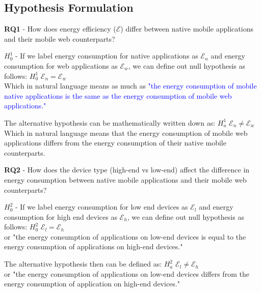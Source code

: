 \subsection{Hypothesis Formulation}
\textbf{RQ1} - How does energy efficiency ($\mathcal{E}$)  differ between native mobile applications and their mobile web counterparts?

$H_0^1$ - If we label energy consumption for native applications as $\mathcal{E}_n$ and  energy consumption for web applications as $\mathcal{E}_w$, we can define out null hypothesis as follows:
\newline $H_0^1$        $\mathcal{E}_n = \mathcal{E}_w$\\
Which in natural language means as much as \textcolor{blue}{ "the energy consumption of mobile native applications is the same as the energy consumption of mobile web applications."}

The alternative hypothesis can be mathematically written down as:
\newline $H_a^1$      $\mathcal{E}_n \neq \mathcal{E}_w$\\ 
Which in natural language means that the energy consumption of mobile web applications differs from the energy consumption of their native mobile counterparts.
 
\textbf{RQ2} - How does the device type (high-end vs low-end) affect the difference in energy consumption between native mobile applications and their mobile  web counterparts?

$H_0^2$ - If we label energy consumption for low end devices as $\mathcal{E}_l$ and  energy consumption for high end devices as $\mathcal{E}_h$, we can define out null hypothesis as follows:
\newline $H_0^2$        $\mathcal{E}_l  = \mathcal{E}_h$\\
or "the energy consumption of applications on low-end devices is equal to the energy consumption of applications on high-end devices."

The alternative hypothesis then can be defined as:
\newline $H_a^2$     $\mathcal{E}_l  \neq  \mathcal{E}_h$\\
or "the energy consumption of applications on low-end devices differs from the energy consumption of application on high-end devices."

